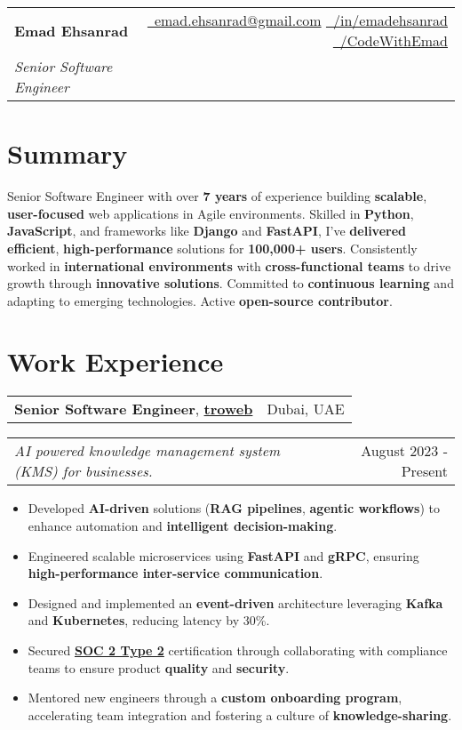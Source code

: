 \documentclass[letterpaper,11pt]{article}
\makeatletter
\newcommand{\resumeFullHeading}[5]{
   \begin{tabular*}{\textwidth}{l@{\extracolsep{\fill}}r}
       \textbf{\Huge #1}\vspace{5px} &
       \small{\href{mailto:#3}{\raisebox{-0.05\height}\faEnvelope \ #3}} \quad
       \small{\href{#4}{\raisebox{-0.05\height}\faLinkedin\ /in/emadehsanrad}} \quad
       \small{\href{#5}{\raisebox{-0.05\height}\faGithub\ /CodeWithEmad}} \\
       \textit{\large #2} & \\
   \end{tabular*}
}
\newcommand{\resumeFullHeadingWithImage}[7]{%
    \begin{minipage}[t]{0.7\textwidth}
        \huge\textbf{#1}\\[0.2em]
        \Large\textit{#2}\\[1em]
        \small{#3 #4 #5}
    \end{minipage}%
    \begin{minipage}[t]{0.3\textwidth}
        \raggedleft
        \raisebox{-2cm}[0pt][0pt]{\texttt{[image: \#6]}}
    \end{minipage}
}
\newcommand{\resumeItemSimple}[1]{
  \item\small{
    {#1}
  }
}
\newcommand{\resumeSubheadingSimple}[5]{
    \begin{tabular*}{1\textwidth}[t]{l@{\extracolsep{\fill}}r}
      \textbf{#1}, \textbf{\href{#3}{#2}} \space \small#4 & \small#5 \\
    \end{tabular*}
}
\newcommand{\resumeSubSubheading}[2]{
    \begin{tabular*}{1\textwidth}{l@{\extracolsep{\fill}}r}
      \textit{\small#1} & \small #2 \\
    \end{tabular*}\vspace{-1pt}
}
\newcommand{\resumeItemListStart}{\begin{itemize}[leftmargin=0.5cm, itemsep=1pt, parsep=0pt]} %
\newcommand{\resumeItemListEnd}{\end{itemize}}
\makeatother
\begin{document}
\resumeFullHeading
  {Emad Ehsanrad}
  {Senior Software Engineer}
  {emad.ehsanrad@gmail.com}
  {https://www.linkedin.com/in/emadehsanrad/}
  {https://github.com/codewithemad}


\section{Summary}
\small
Senior Software Engineer with over \textbf{7 years} of experience building \textbf{scalable},
\textbf{user-focused} web applications in Agile environments.
Skilled in \textbf{Python}, \textbf{JavaScript}, and frameworks like \textbf{Django} and \textbf{FastAPI},
I've \textbf{delivered efficient}, \textbf{high-performance} solutions for \textbf{100,000+ users}.
Consistently worked in \textbf{international environments} with \textbf{cross-functional teams}
to drive growth through \textbf{innovative solutions}. Committed to \textbf{continuous learning}
and adapting to emerging technologies. Active \textbf{open-source contributor}.

\section{Work Experience}

    \resumeSubheadingSimple
      {Senior Software Engineer}{troweb}{https://www.linkedin.com/company/troweb/}{}{Dubai, UAE}
      \resumeSubSubheading{AI powered knowledge management system (KMS) for businesses.}{August 2023 - Present}
      \resumeItemListStart
        \resumeItemSimple{Developed \textbf{AI-driven} solutions (\textbf{RAG pipelines}, \textbf{agentic workflows}) to enhance automation and \textbf{intelligent decision-making}.}
        \resumeItemSimple{Engineered scalable microservices using \textbf{FastAPI} and \textbf{gRPC}, ensuring \textbf{high-performance inter-service communication}.}
        \resumeItemSimple{Designed and implemented an \textbf{event-driven} architecture leveraging \textbf{Kafka} and \textbf{Kubernetes}, reducing latency by 30\%.}        \resumeItemSimple{Secured \href{https://sprinto.com/blog/soc-2-type-2/}{\textbf{SOC 2 Type 2}} certification through collaborating with compliance teams to ensure product \textbf{quality} and \textbf{security}.}
        \resumeItemSimple{Mentored new engineers through a \textbf{custom onboarding program}, accelerating team integration and fostering a culture of \textbf{knowledge-sharing}.}
      \resumeItemListEnd
\end{document}
